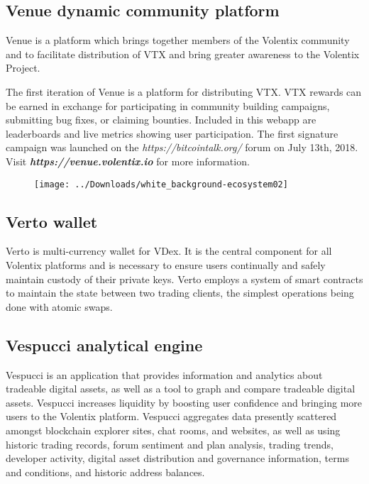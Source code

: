 \documentclass[]{article}
\begin{document}
\subsection {Venue dynamic community platform}

Venue is a platform which brings together members of the Volentix community 
and to facilitate distribution of VTX and bring greater awareness to the Volentix Project. 

The first iteration of Venue is a platform for distributing VTX. 
VTX rewards can be earned in exchange for participating in community building campaigns, submitting bug fixes, or claiming bounties. 
Included in this webapp are leaderboards and live metrics showing user participation. 
The first signature campaign was launched on the \textit{https://bitcointalk.org/} forum on July 13th, 2018. 
Visit \textbf{\textit{https://venue.volentix.io}} for more information. 
	
\begin{figure}
	\centering
	\texttt{[image: ../Downloads/white\_background-ecosystem02]}
	\caption{}
	\label{fig:whitebackground-ecosystem02}
\end{figure}



\subsection {Verto wallet}
Verto is multi-currency wallet for VDex. 
It is the central component for all Volentix platforms and is necessary to ensure users continually and safely maintain custody of their private keys.
Verto employs a system of smart contracts to maintain the state between two trading clients, the simplest operations being done with atomic swaps. 

\subsection {Vespucci analytical engine}
Vespucci is an application that provides information and analytics about tradeable digital assets, 
as well as a tool to graph and compare tradeable digital assets. 
Vespucci increases liquidity by boosting user confidence and bringing more users to the Volentix platform.
Vespucci aggregates data presently scattered amongst blockchain explorer sites, chat rooms, and websites, 
as well as using historic trading records, forum sentiment and plan analysis, trading trends, developer activity,
digital asset distribution and governance information, terms and conditions, and historic address balances.
\end{document}
